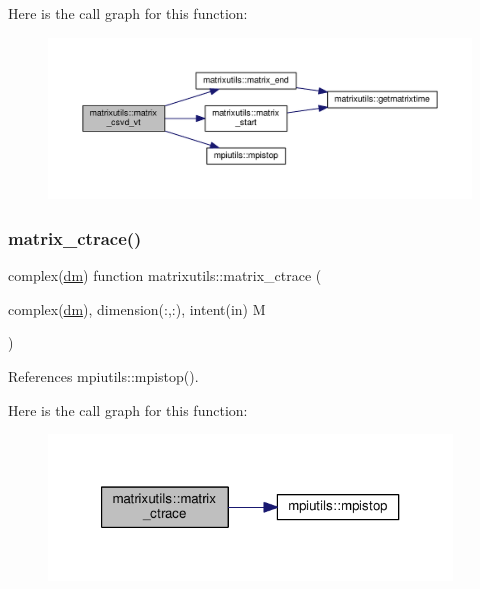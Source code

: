Here is the call graph for this function\+:
\nopagebreak
\begin{figure}[H]
\begin{center}
\leavevmode
\includegraphics[width=350pt]{namespacematrixutils_a536eb03269736dd2f4c33b0978211583_cgraph}
\end{center}
\end{figure}
\mbox{\label{namespacematrixutils_af3bd404fd6685b9f8d2863bb4a3c06e4}} 
\subsubsection{\texorpdfstring{matrix\+\_\+ctrace()}{matrix\_ctrace()}}
{\footnotesize\ttfamily complex(\mbox{\hyperlink{namespacematrixutils_a7bdc564986ea4d90f51201c75606ef3d}{dm}}) function matrixutils\+::matrix\+\_\+ctrace (\begin{DoxyParamCaption}\item[{complex(\mbox{\hyperlink{namespacematrixutils_a7bdc564986ea4d90f51201c75606ef3d}{dm}}), dimension(\+:,\+:), intent(in)}]{M }\end{DoxyParamCaption})}



References mpiutils\+::mpistop().

Here is the call graph for this function\+:
\nopagebreak
\begin{figure}[H]
\begin{center}
\leavevmode
\includegraphics[width=304pt]{namespacematrixutils_af3bd404fd6685b9f8d2863bb4a3c06e4_cgraph}
\end{center}
\end{figure}
\mbox{\label{namespacematrixutils_a6b563974ed42131dcdd0b7c5e009fb33}} 
